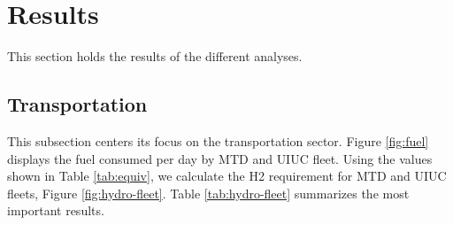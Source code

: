 \documentclass[11pt,letterpaper]{article}
\begin{document}
\section{Results}
\label{sec:Results}

This section holds the results of the different analyses.

\subsection{Transportation}

This subsection centers its focus on the transportation sector.
Figure \ref{fig:fuel} displays the fuel consumed per day by \gls{MTD} and \gls{UIUC} fleet.
Using the values shown in Table \ref{tab:equiv}, we calculate the \gls{H2} requirement for MTD and UIUC fleets, Figure \ref{fig:hydro-fleet}.
Table \ref{tab:hydro-fleet} summarizes the most important results.
\end{document}
